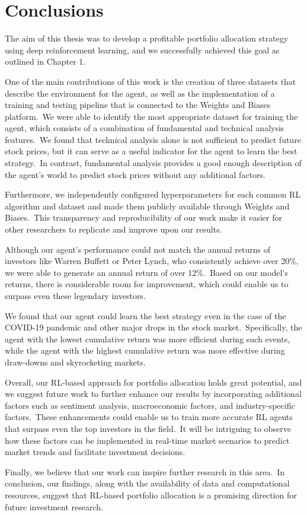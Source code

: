 \documentclass[../xlapes02]{subfiles}
\begin{document}
    \chapter{Conclusions}\label{ch:conclusions}
    The aim of this thesis was to develop a profitable portfolio allocation strategy using deep reinforcement learning, and we successfully achieved this goal as outlined in Chapter 1.

    One of the main contributions of this work is the creation of three datasets that describe the environment for the agent, as well as the implementation of a training and testing pipeline that is connected to the Weights and Biases platform.\ We were able to identify the most appropriate dataset for training the agent, which consists of a combination of fundamental and technical analysis features.\ We found that technical analysis alone is not sufficient to predict future stock prices, but it can serve as a useful indicator for the agent to learn the best strategy.\ In contrast, fundamental analysis provides a good enough description of the agent's world to predict stock prices without any additional factors.

    Furthermore, we independently configured hyperparameters for each common RL algorithm and dataset and made them publicly available through Weights and Biases.\ This transparency and reproducibility of our work make it easier for other researchers to replicate and improve upon our results.

    Although our agent's performance could not match the annual returns of investors like Warren Buffett or Peter Lynch, who consistently achieve over 20\%, we were able to generate an annual return of over 12\%.\ Based on our model's returns, there is considerable room for improvement, which could enable us to surpass even these legendary investors.

    We found that our agent could learn the best strategy even in the case of the COVID-19 pandemic and other major drops in the stock market.\ Specifically, the agent with the lowest cumulative return was more efficient during such events, while the agent with the highest cumulative return was more effective during draw-downs and skyrocketing markets.

    Overall, our RL-based approach for portfolio allocation holds great potential, and we suggest future work to further enhance our results by incorporating additional factors such as sentiment analysis, macroeconomic factors, and industry-specific factors.\ These enhancements could enable us to train more accurate RL agents that surpass even the top investors in the field.\ It will be intriguing to observe how these factors can be implemented in real-time market scenarios to predict market trends and facilitate investment decisions.

    Finally, we believe that our work can inspire further research in this area.\ In conclusion, our findings, along with the availability of data and computational resources, suggest that RL-based portfolio allocation is a promising direction for future investment research.
\end{document}
